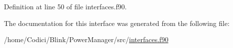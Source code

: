 Definition at line 50 of file interfaces.\-f90.



The documentation for this interface was generated from the following file\-:\begin{DoxyCompactItemize}
\item 
/home/\-Codici/\-Blink/\-Power\-Manager/src/\hyperlink{interfaces_8f90}{interfaces.\-f90}\end{DoxyCompactItemize}
